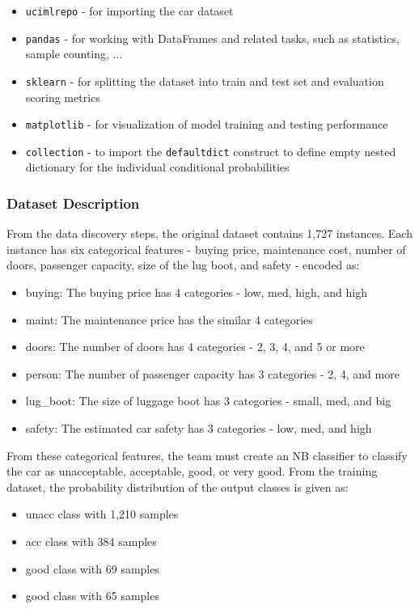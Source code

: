 \documentclass[a4paper]{article}
\begin{document}
\begin{itemize}
    \item \lstinline{ucimlrepo} - for importing the car dataset
    \item \lstinline{pandas} - for working with DataFrames and related tasks, such as statistics, sample counting, ...
    \item \lstinline{sklearn} - for splitting the dataset into train and test set and evaluation scoring metrics 
    \item \lstinline{matplotlib} - for visualization of model training and testing performance
    \item \lstinline{collection} - to import the \lstinline{defaultdict} construct to define empty nested dictionary for the individual conditional probabilities
\end{itemize}

\subsubsection{Dataset Description}
From the data discovery steps, the original dataset contains 1,727 instances. Each instance has six categorical features - buying price, maintenance cost, number of doors, passenger capacity, size of the lug boot, and safety - encoded as:

\begin{itemize}
    \item buying: The buying price has 4 categories - low, med, high, and high
    \item  maint: The maintenance price has the similar 4 categories
    \item doors: The number of doors has 4 categories - 2, 3, 4, and 5 or more
    \item person: The number of passenger capacity has 3 categories - 2, 4, and more
    \item lug\_boot: The size of luggage boot has 3 categories - small, med, and big
    \item safety: The estimated car safety has 3 categories - low, med, and high
\end{itemize}

From these categorical features, the team must create an NB classifier to classify the car as unacceptable, acceptable, good, or very good. From the training dataset, the probability distribution of the output classes is given as:

\begin{itemize}
    \item unacc class with 1,210 samples
    \item acc class with 384 samples
    \item good class with 69 samples
    \item good class with 65 samples
\end{itemize}
\end{document}
